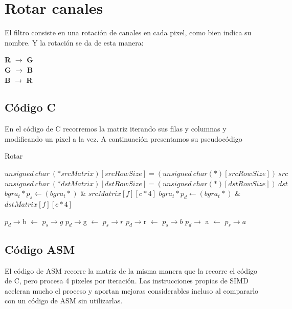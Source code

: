 \section{Rotar canales}
El filtro consiste en una rotación de canales en cada pixel, como bien indica su nombre. Y la rotación se da de esta manera:
\begin{center}
\textbf{R} $\longrightarrow$ \textbf{G}\\
\textbf{G} $\longrightarrow$ \textbf{B}\\
\textbf{B} $\longrightarrow$ \textbf{R}\\
\end{center}

\subsection{Código C}
En el código de C recorremos la matriz iterando sus filas y columnas y modificando un pixel a la vez.
A continuación presentamos su pseudocódigo

\begin{algorithm}[h!]
\caption{Rotar}
\begin{algorithmic}
	\State $unsigned~ char~ (*srcMatrix)[srcRowSize] = (unsigned~ char (*)[srcRowSize])~ src$
	\State $unsigned~ char~ (*dstMatrix)[dstRowSize] = (unsigned~ char (*)[dstRowSize])~ dst$
			\State $bgra_t* p_s \gets (bgra_t*)$ \& $srcMatrix[f][c * 4]$
			\State $bgra_t *p_d \gets (bgra_t*)$ \&$dstMatrix[f][c * 4]$
			
			\State $p_d \rightarrow$b $\gets$ $p_s \rightarrow g$
			\State $p_d \rightarrow$g $\gets$ $p_s \rightarrow r$
			\State $p_d \rightarrow$r $\gets$ $p_s \rightarrow b$
			\State $p_d \rightarrow$ a $\gets$ $p_s \rightarrow a$
		\EndFor
	\EndFor
\EndFunction
\end{algorithmic} 
\end{algorithm}
	
\subsection{Código ASM}
El código de ASM recorre la matriz de la misma manera que la recorre el código de C, pero procesa 4 pixeles por iteración.
Las instrucciones propias de SIMD aceleran mucho el proceso y aportan mejoras considerables incluso al compararlo con un código de ASM sin utilizarlas.

